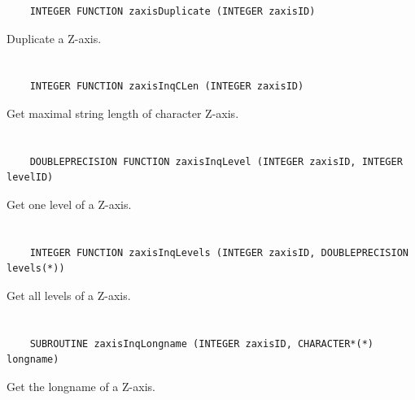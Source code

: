 \begin{verbatim}
    INTEGER FUNCTION zaxisDuplicate (INTEGER zaxisID)
\end{verbatim}

Duplicate a Z-axis.


\section*{\tt {}}

\begin{verbatim}
    INTEGER FUNCTION zaxisInqCLen (INTEGER zaxisID)
\end{verbatim}

Get maximal string length of character Z-axis.


\section*{\tt {}}

\begin{verbatim}
    DOUBLEPRECISION FUNCTION zaxisInqLevel (INTEGER zaxisID, INTEGER levelID)
\end{verbatim}

Get one level of a Z-axis.


\section*{\tt {}}

\begin{verbatim}
    INTEGER FUNCTION zaxisInqLevels (INTEGER zaxisID, DOUBLEPRECISION levels(*))
\end{verbatim}

Get all levels of a Z-axis.


\section*{\tt {}}

\begin{verbatim}
    SUBROUTINE zaxisInqLongname (INTEGER zaxisID, CHARACTER*(*) longname)
\end{verbatim}

Get the longname of a Z-axis.


\section*{\tt {}}

